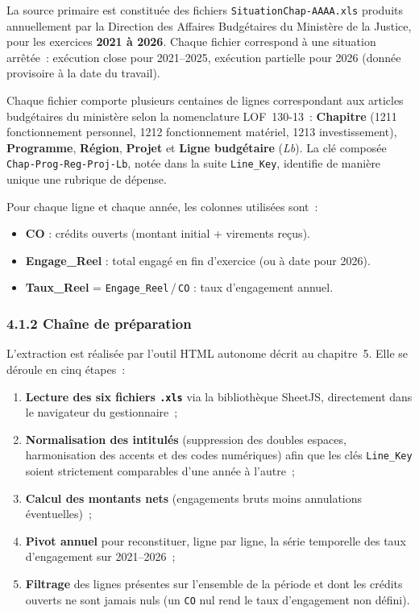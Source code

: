 La source primaire est constitu\'ee des fichiers \texttt{SituationChap-AAAA.xls}
produits annuellement par la Direction des Affaires Budg\'etaires du Minist\`ere
de la Justice, pour les exercices \textbf{2021 \`a 2026}. Chaque fichier
correspond \`a une situation arr\^et\'ee~: ex\'ecution close pour 2021--2025,
ex\'ecution partielle pour 2026 (donn\'ee provisoire \`a la date du travail).

Chaque fichier comporte plusieurs centaines de lignes correspondant aux
articles budg\'etaires du minist\`ere selon la nomenclature LOF~130-13~:
\textbf{Chapitre} (1211 fonctionnement personnel, 1212 fonctionnement
mat\'eriel, 1213 investissement), \textbf{Programme}, \textbf{R\'egion},
\textbf{Projet} et \textbf{Ligne budg\'etaire} (\textit{Lb}). La cl\'e
compos\'ee \texttt{Chap-Prog-Reg-Proj-Lb}, not\'ee dans la suite
\texttt{Line\_Key}, identifie de mani\`ere unique une rubrique de d\'epense.

Pour chaque ligne et chaque ann\'ee, les colonnes utilis\'ees sont~:

\begin{itemize}
    \item \textbf{CO} : cr\'edits ouverts (montant initial + virements re\c{c}us).
    \item \textbf{Engage\_Reel} : total engag\'e en fin d'exercice (ou \`a date pour 2026).
    \item \textbf{Taux\_Reel} = \texttt{Engage\_Reel}\,/\,\texttt{CO} : taux d'engagement annuel.
\end{itemize}

\subsubsection*{4.1.2 \quad Cha\^ine de pr\'eparation}

L'extraction est r\'ealis\'ee par l'outil HTML autonome d\'ecrit au
chapitre~5. Elle se d\'eroule en cinq \'etapes~:

\begin{enumerate}
    \item \textbf{Lecture des six fichiers \texttt{.xls}} via la biblioth\`eque
    SheetJS, directement dans le navigateur du gestionnaire~;
    \item \textbf{Normalisation des intitul\'es} (suppression des doubles
    espaces, harmonisation des accents et des codes num\'eriques) afin que les
    cl\'es \texttt{Line\_Key} soient strictement comparables d'une ann\'ee \`a
    l'autre~;
    \item \textbf{Calcul des montants nets} (engagements bruts moins
    annulations \'eventuelles)~;
    \item \textbf{Pivot annuel} pour reconstituer, ligne par ligne, la
    s\'erie temporelle des taux d'engagement sur 2021--2026~;
    \item \textbf{Filtrage} des lignes pr\'esentes sur l'ensemble de la p\'eriode
    et dont les cr\'edits ouverts ne sont jamais nuls (un \texttt{CO} nul rend
    le taux d'engagement non d\'efini).
\end{enumerate}

